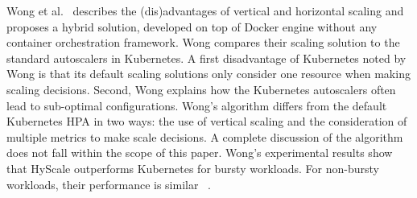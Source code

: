 Wong et al.~\citep{hyscale} describes the (dis)advantages of vertical and horizontal scaling and proposes a hybrid solution, developed on top of Docker engine without any container orchestration framework. 
%
%
%
%
Wong compares their scaling solution to the standard autoscalers in Kubernetes. A first disadvantage of Kubernetes noted by Wong is that its default scaling solutions only consider one resource when making scaling decisions. Second, Wong explains how the Kubernetes autoscalers often lead to sub-optimal configurations. 
Wong's algorithm differs from the default Kubernetes HPA in two ways: the use of vertical scaling and the consideration of multiple metrics to make scale decisions. 
A complete discussion of the algorithm does not fall within the scope of this paper. 
Wong's experimental results show that HyScale outperforms Kubernetes for bursty workloads. For non-bursty workloads, their performance is similar
~\citep{hyscale}.

